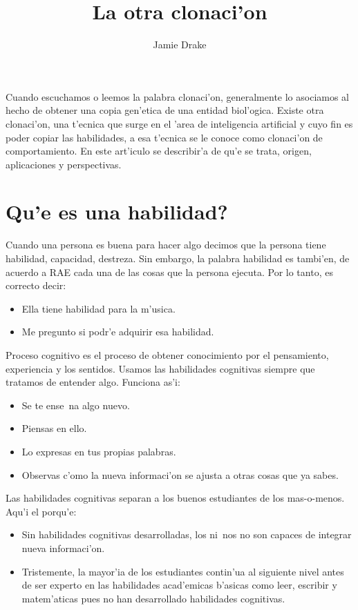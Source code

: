 \documentclass[11pt]{article}
\begin{document}
\title{La otra clonaci'on}
\author{Jamie Drake}

\maketitle
Cuando escuchamos o leemos la palabra clonaci'on, generalmente lo asociamos al hecho de obtener una copia gen'etica de una entidad biol'ogica. Existe otra clonaci'on, una t'ecnica que surge en el 'area de inteligencia artificial y cuyo fin es poder copiar las habilidades, a esa t'ecnica se le conoce como clonaci'on de comportamiento. En este art'iculo se describir'a de qu'e se trata, origen, aplicaciones y perspectivas.

\section{\textquestiondown Qu'e es una habilidad?} 

Cuando una persona es buena para hacer algo decimos que la persona tiene habilidad, capacidad, destreza. Sin embargo, la palabra habilidad es tambi'en, de acuerdo a RAE cada una de las cosas que la persona ejecuta. Por lo tanto, es correcto decir:

\begin{itemize}
\item Ella tiene habilidad para la m'usica. 
\item Me pregunto si podr'e adquirir esa habilidad.
\end{itemize}
Proceso cognitivo es el proceso de obtener conocimiento por el pensamiento, experiencia y los sentidos. Usamos las habilidades cognitivas siempre que tratamos de entender algo. Funciona as'i:

\begin{itemize}
\item Se te ense~na algo nuevo.
\item Piensas en ello.
\item Lo expresas en tus propias palabras.
\item Observas c'omo la nueva informaci'on se ajusta a otras cosas que ya sabes.
\end{itemize}

Las habilidades cognitivas separan a los buenos estudiantes de los mas-o-menos. Aqu'i el porqu'e:
\begin{itemize}
\item Sin habilidades cognitivas desarrolladas, los ni~nos no son capaces de integrar nueva informaci'on.
\item Tristemente, la mayor'ia de los estudiantes contin'ua al siguiente nivel antes de ser experto en las habilidades acad'emicas b'asicas como leer, escribir y matem'aticas pues no han desarrollado habilidades cognitivas.
\end{itemize}
\end{document}
